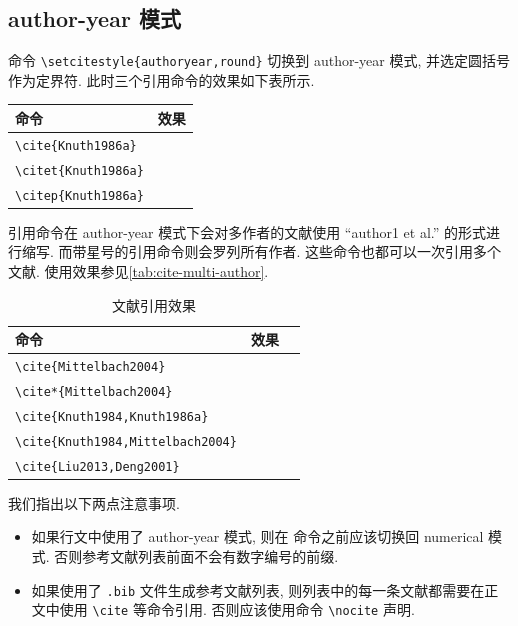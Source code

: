 \subsection{author-year 模式}

命令 \verb|\setcitestyle{authoryear,round}| 切换到 author-year 模式, 并选定圆括号作为定界符.
此时三个引用命令的效果如下表所示.

\begin{center}
  \begin{tabular}{ll}
    \toprule
    命令                      & 效果\\
    \midrule
    \verb|\cite{Knuth1986a}|  & \cite{Knuth1986a}\\
    \verb|\citet{Knuth1986a}| & \citet{Knuth1986a}\\
    \verb|\citep{Knuth1986a}| & \citep{Knuth1986a}\\
    \bottomrule
  \end{tabular}
\end{center}

引用命令在 author-year 模式下会对多作者的文献使用 ``author1 et al.'' 的形式进行缩写.
而带星号的引用命令则会罗列所有作者. 这些命令也都可以一次引用多个文献.
使用效果参见\autoref{tab:cite-multi-author}.

\begin{table}[!htb]
  \caption{文献引用效果}
  \label{tab:cite-multi-author}
  \centering
  \begin{tabular}{lp{}l}
    \toprule
    命令                                   & 效果\\
    \midrule
    \verb|\cite{Mittelbach2004}|           & \cite{Mittelbach2004}\\
    \verb|\cite*{Mittelbach2004}|          & \cite*{Mittelbach2004}\\
    \verb|\cite{Knuth1984,Knuth1986a}|     & \cite{Knuth1984,Knuth1986a}\\
    \verb|\cite{Knuth1984,Mittelbach2004}| & \cite{Knuth1984,Mittelbach2004}\\
    \verb|\cite{Liu2013,Deng2001}|         & \cite{Liu2013,Deng2001}\\
    \bottomrule
  \end{tabular}
\end{table}

我们指出以下两点注意事项.
\begin{itemize}
  \item
    如果行文中使用了 author-year 模式, 则在 \verb|| 命令之前应该切换回 numerical 模式. 否则参考文献列表前面不会有数字编号的前缀.
  \item
    如果使用了 \verb|.bib| 文件生成参考文献列表, 则列表中的每一条文献都需要在正文中使用 \verb|\cite| 等命令引用. 否则应该使用命令 \verb|\nocite| 声明.
\end{itemize}
